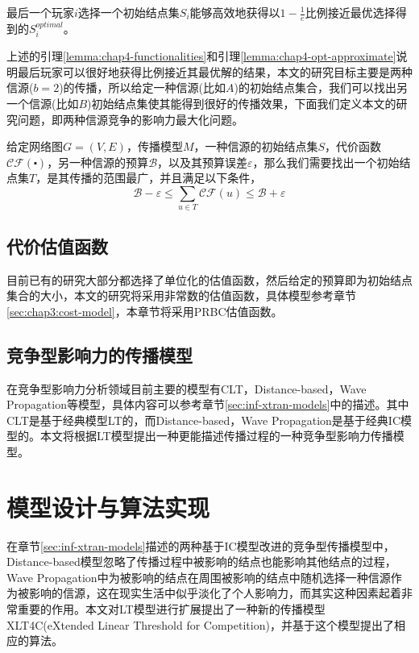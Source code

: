 \begin{lemma}
\label{lemma:chap4-opt-approximate}
最后一个玩家$i$选择一个初始结点集$S_{i}$能够高效地获得以$1-\frac{1}{e}$比例接近最优选择得到的$S_{i}^{optimal}$。
\end{lemma}

上述的引理\ref{lemma:chap4-functionalities}和引理\ref{lemma:chap4-opt-approximate}说明最后玩家可以很好地获得比例接近其最优解的结果，本文的研究目标主要是两种信源($b=2$)的传播，所以给定一种信源(比如$A$)的初始结点集合，我们可以找出另一个信源(比如$B$)初始结点集使其能得到很好的传播效果，下面我们定义本文的研究问题，即两种信源竞争的影响力最大化问题。
\begin{definition}
\label{def:chap4-self-on-cim}
给定网络图$G=(V,E)$，传播模型$M$，一种信源的初始结点集$S$，代价函数$\mathcal{CF}(\centerdot)$，另一种信源的预算$\mathcal{B}$，以及其预算误差$\varepsilon$，那么我们需要找出一个初始结点集$T$，是其传播的范围最广，并且满足以下条件，
\begin{displaymath}
\mathcal{B} - \varepsilon \leq \sum_{u \in T}\mathcal{CF}(u) \leq \mathcal{B} + \varepsilon
\end{displaymath}
\end{definition}

\subsection{代价估值函数}
目前已有的研究大部分都选择了单位化的估值函数，然后给定的预算即为初始结点集合的大小，本文的研究将采用非常数的估值函数，具体模型参考章节\ref{sec:chap3:cost-model}，本章节将采用PRBC估值函数。


\subsection{竞争型影响力的传播模型}
在竞争型影响力分析领域目前主要的模型有CLT，Distance-based，Wave Propagation等模型，具体内容可以参考章节\ref{sec:inf-xtran-models}中的描述。其中CLT是基于经典模型LT的，而Distance-based，Wave Propagation是基于经典IC模型的。本文将根据LT模型提出一种更能描述传播过程的一种竞争型影响力传播模型。


\section{模型设计与算法实现}
在章节\ref{sec:inf-xtran-models}描述的两种基于IC模型改进的竞争型传播模型中，Distance-based模型忽略了传播过程中被影响的结点也能影响其他结点的过程，Wave Propagation中为被影响的结点在周围被影响的结点中随机选择一种信源作为被影响的信源，这在现实生活中似乎淡化了个人影响力，而其实这种因素起着非常重要的作用。本文对LT模型进行扩展提出了一种新的传播模型XLT4C(eXtended Linear Threshold for Competition)，并基于这个模型提出了相应的算法。


